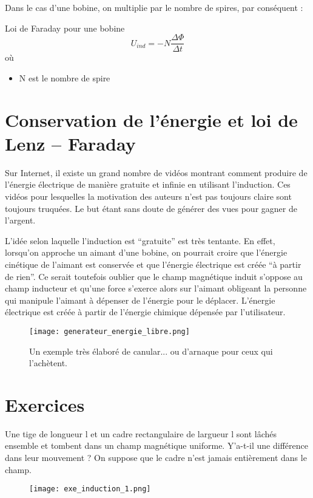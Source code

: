 Dans le cas d'une bobine, on multiplie par le nombre de spires, par conséquent :
\begin{encadre_equation*}{Loi de Faraday pour une bobine}
    \begin{equation}
        U_{ind}=-N \frac{\Delta \Phi}{\Delta t}
    \end{equation} où
    \begin{itemize}[label=\textbullet]
        \item N est le nombre de spire
    \end{itemize}
\end{encadre_equation*}

\section{Conservation de l'énergie et loi de Lenz – Faraday}
Sur Internet, il existe un grand nombre de vidéos montrant comment produire de l'énergie électrique de manière gratuite et infinie en utilisant l'induction. Ces vidéos pour lesquelles la motivation des auteurs n'est pas toujours claire sont toujours truquées. Le but étant sans doute de générer des vues pour gagner de l'argent.

L'idée selon laquelle l'induction est \enquote{gratuite} est très tentante. En effet, lorsqu'on approche un aimant d'une bobine, on pourrait croire que l'énergie cinétique de l'aimant est conservée et que l'énergie électrique est créée \enquote{à partir de rien}. Ce serait toutefois oublier que le champ magnétique induit s'oppose au champ inducteur et qu'une force s'exerce alors sur l'aimant obligeant la personne qui manipule l'aimant à dépenser de l'énergie pour le déplacer. L'énergie électrique est créée à partir de l'énergie chimique dépensée par l'utilisateur.

\begin{figure}[h]
    \centering
    \texttt{[image: generateur\_energie\_libre.png]}
    \caption{Un exemple très élaboré de canular... ou d'arnaque pour ceux qui l'achètent.}
    \label{generateur_energie_libre}
\end{figure}

\newpage

\section{Exercices}
\begin{exercise}
    Une tige de longueur l et un cadre rectangulaire de largueur l sont lâchés ensemble et tombent dans un champ magnétique uniforme. Y'a-t-il une différence dans leur mouvement ? On suppose que le cadre n'est jamais entièrement dans le champ.
    \begin{figure}[h!]
        \centering
        \texttt{[image: exe\_induction\_1.png]}
        \label{loi_faraday}
    \end{figure}
\end{exercise}

